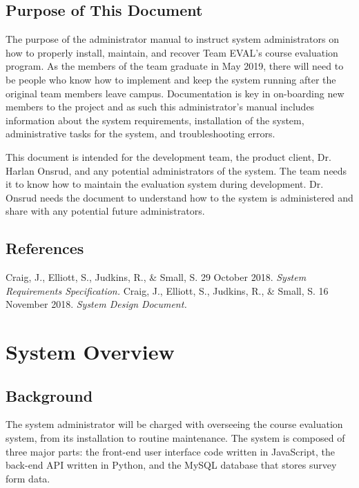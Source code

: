 \documentclass{article}
\begin{document}
\subsection{Purpose of This Document}

The purpose of the administrator manual to instruct system administrators on how to properly install, maintain, and recover Team EVAL's course evaluation program. As the members of the team graduate in May 2019, there will need to be people who know how to implement and keep the system running after the original team members leave campus.  Documentation is key in on-boarding new members to the project and as such this administrator's manual includes information about the system requirements, installation of the system, administrative tasks for the system, and troubleshooting errors.

This document is intended for the development team, the product client, Dr. Harlan Onsrud, and any potential administrators of the system. The team needs it to know how to maintain the evaluation system during development. Dr. Onsrud needs the document to understand how to the system is administered and share with any potential future administrators.

\subsection{References}

Craig, J., Elliott, S., Judkins, R., \& Small, S. 29 October 2018. \textit{System Requirements Specification.}
\vspace{3mm}\newline
Craig, J., Elliott, S., Judkins, R., \& Small, S. 16 November 2018. \textit{System Design Document.}

\section{System Overview}

\subsection{Background}

The system administrator will be charged with overseeing the course evaluation system, from its installation to routine maintenance. The system is composed of three major parts: the front-end user interface code written in JavaScript, the back-end API written in Python, and the MySQL database that stores survey form data. 
\end{document}
